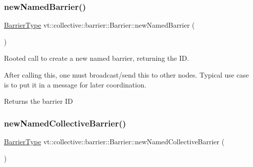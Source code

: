 \mbox{\label{structvt_1_1collective_1_1barrier_1_1_barrier_a0d8e74149ddca96f06c1ff6071b73a74}} 
\subsubsection{\texorpdfstring{new\+Named\+Barrier()}{newNamedBarrier()}}
{\footnotesize\ttfamily \hyperlink{namespacevt_a25e481f0d6bbc7204db23d1c87a62e77}{Barrier\+Type} vt\+::collective\+::barrier\+::\+Barrier\+::new\+Named\+Barrier (\begin{DoxyParamCaption}{ }\end{DoxyParamCaption})}



Rooted call to create a new named barrier, returning the ID. 

After calling this, one must broadcast/send this to other nodes. Typical use case is to put it in a message for later coordination.

\begin{DoxyReturn}{Returns}
the barrier ID 
\end{DoxyReturn}
\mbox{\label{structvt_1_1collective_1_1barrier_1_1_barrier_a3e101519fbcfa9eee139bf02f991f085}} 
\subsubsection{\texorpdfstring{new\+Named\+Collective\+Barrier()}{newNamedCollectiveBarrier()}}
{\footnotesize\ttfamily \hyperlink{namespacevt_a25e481f0d6bbc7204db23d1c87a62e77}{Barrier\+Type} vt\+::collective\+::barrier\+::\+Barrier\+::new\+Named\+Collective\+Barrier (\begin{DoxyParamCaption}{ }\end{DoxyParamCaption})}



